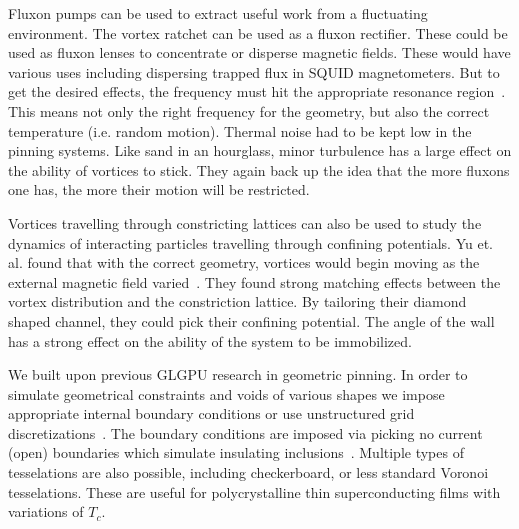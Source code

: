 Fluxon pumps can be used to extract useful work from a fluctuating environment. The vortex ratchet can be used as a fluxon rectifier. These could be used as fluxon lenses to concentrate or disperse magnetic fields. These would have various uses including dispersing trapped flux in SQUID magnetometers. But to get the desired effects, the frequency must hit the appropriate resonance region~\cite{Wambaugh99}. This means not only the right frequency for the geometry, but also the correct temperature (i.e. random motion). Thermal noise had to be kept low in the pinning systems. Like sand in an hourglass, minor turbulence has a large effect on the ability of vortices to stick. They again back up the idea that the more fluxons one has, the more their motion will be restricted.

Vortices travelling through constricting lattices can also be used to study the dynamics of interacting particles travelling through confining potentials. Yu et. al. found that with the correct geometry, vortices would begin moving as the external magnetic field varied~\cite{Yu10}. They found strong matching effects between the vortex distribution and the constriction lattice. By tailoring their diamond shaped channel, they could pick their confining potential. The angle of the wall has a strong effect on the ability of the system to be immobilized.

We built upon previous GLGPU research in geometric pinning. In order to simulate geometrical constraints and voids of various shapes we impose appropriate internal boundary conditions or use unstructured grid discretizations~\cite{Kwok16}. The boundary conditions are imposed via picking no current (open) boundaries which simulate insulating inclusions~\cite{Sadovskyy14}. Multiple types of tesselations are also possible, including checkerboard, or less standard Voronoi tesselations. These are useful for polycrystalline thin superconducting films with variations of $T_c$.

 

